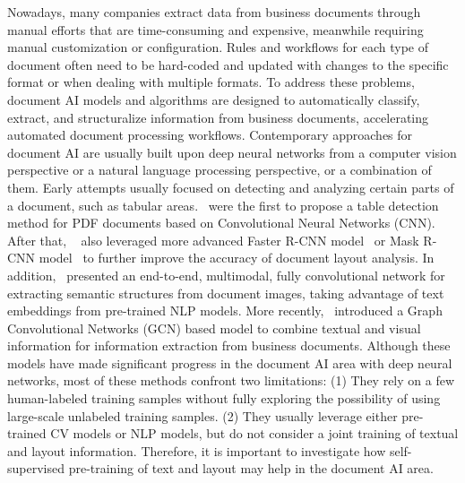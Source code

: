 \documentclass[sigconf]{acmart}
\begin{document}
Nowadays, many companies extract data from business documents through manual efforts that are time-consuming and expensive, meanwhile requiring manual customization or configuration. Rules and workflows for each type of document often need to be hard-coded and updated with changes to the specific format or when dealing with multiple formats. To address these problems, document AI models and algorithms are designed to automatically classify, extract, and structuralize information from business documents, accelerating automated document processing workflows. Contemporary approaches for document AI are usually built upon deep neural networks from a computer vision perspective or a natural language processing perspective, or a combination of them. Early attempts usually focused on detecting and analyzing certain parts of a document, such as tabular areas.~\cite{Hao2016ATD} were the first to propose a table detection method for PDF documents based on Convolutional Neural Networks (CNN). After that, ~\citep{Schreiber2017DeepDeSRTDL,soto-yoo-2019-visual,Zhong2019PubLayNetLD} also leveraged more advanced Faster R-CNN model~\citep{Ren2015FasterRT} or Mask R-CNN model~\citep{DBLP:journals/corr/HeGDG17} to further improve the accuracy of document layout analysis. In addition,~\cite{Yang2017LearningTE} presented an end-to-end, multimodal, fully convolutional network for extracting semantic structures from document images, taking advantage of text embeddings from pre-trained NLP models. More recently,~\cite{liu-etal-2019-graph} introduced a Graph Convolutional Networks (GCN) based model to combine textual and visual information for information extraction from business documents. Although these models have made significant progress in the document AI area with deep neural networks, most of these methods confront two limitations: (1) They rely on a few human-labeled training samples without fully exploring the possibility of using large-scale unlabeled training samples. (2) They usually leverage either pre-trained CV models or NLP models, but do not consider a joint training of textual and layout information. Therefore, it is important to investigate how self-supervised pre-training of text and layout may help in the document AI area.
\end{document}
